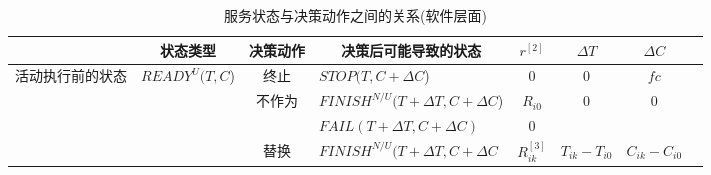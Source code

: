 \begin{table}[htbp]
    \caption{服务状态与决策动作之间的关系(软件层面)}
    \vspace{-0.5em}\label{table:state_action}\centering{}
    \begin{threeparttable}
        \begin{tabular}{llllllll}
            \toprule
            \multicolumn{1}{|c|}{} 
            & \multicolumn{1}{c}{状态类型} 
            & \multicolumn{1}{|c}{{决策动作}} 
            & \multicolumn{1}{|c}{决策后可能导致的状态} 
            & \multicolumn{1}{|c}{$r^{[2]}$} 
            & \multicolumn{1}{|c}{$\Delta T$} 
            & \multicolumn{1}{|c|}{$\Delta C$} \\
            \hline
            
            \multicolumn{1}{|c|}{\multirow{9}{*}{\parbox{1em}{活动执行前的状态}}} 
            & \multirow{7}{*}{$READY^U(T,C$)} 
            & \multicolumn{1}{|c}{{终止}} 
            & \multicolumn{1}{|l}{$STOP(T, C+\Delta C$)} 
            & \multicolumn{1}{|c}{0} 
            & \multicolumn{1}{|c}{0} 
            & \multicolumn{1}{|c|}{$fc$} \\
            \cline{3-7}
            
            \multicolumn{1}{|c|}{} 
            &       
            & \multicolumn{1}{|c}{\multirow{2}{*}{{不作为}}} 
            & \multicolumn{1}{|l}{$FINISH^{N/U}(T+\Delta T, C+\Delta C$)} 
            & \multicolumn{1}{|c}{$R_{i0}$} 
            & \multicolumn{1}{|c}{\multirow{2}{*}{0}} 
            & \multicolumn{1}{|c|}{\multirow{2}{*}{0}} \\
            
            \multicolumn{1}{|c|}{} 
            &       
            & \multicolumn{1}{|c}{} 
            & \multicolumn{1}{|l}{$FAIL(T+\Delta T, C+\Delta C)$} 
            & \multicolumn{1}{|c}{0}
            & \multicolumn{1}{|c}{} 
            & \multicolumn{1}{|c|}{} \\
            \cline{3-7}
            
            \multicolumn{1}{|c|}{} 
            &       
            & \multicolumn{1}{|c}{\multirow{2}{*}{替换}} 
            & \multicolumn{1}{|l}{$FINISH^{N/U}(T+\Delta T, C+\Delta C$} 
            & \multicolumn{1}{|c}{$R_{ik}^{[3]}$} 
            & \multicolumn{1}{|c}{\multirow{2}{*}{$T_{ik}-T_{i0}$}} 
            & \multicolumn{1}{|c|}{\multirow{2}{*}{$C_{ik}-C_{i0}$}} \\
            

\end{tabular}
\end{threeparttable}
\end{table}
